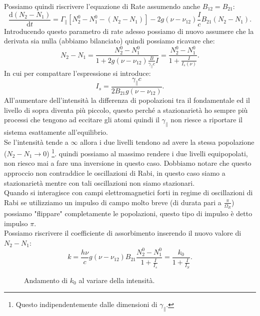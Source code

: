 Possiamo quindi riscrivere l'equazione di Rate assumendo anche $B_{12}=B_{21}$:
\[
    \frac{\text{d} \left(N_2-N_1\right)}{\text{d} t} =
    \Gamma_{\parallel}\left[N_2^0-N_1^0 - \left(N_2-N_1\right)\right]
    -2g(\nu-\nu_{12}) \frac{I}{c}B_{21}\left(N_2-N_1\right)
.\] 
Introducendo questo parametro di rate adesso possiamo di nuovo assumere che la derivata sia nulla (abbiamo bilanciato) quindi possiamo ricavare che:
\[
    N_2-N_1 = \frac{N_2^0-N_1^0}{1+2g(\nu-\nu_{12})
    \frac{B}{\gamma_{\parallel}c}I}=
    \frac{N_2^0-N_1^0}{1+\frac{I}{I_s(\nu)}}
.\] 
In cui per compattare l'espressione si introduce:
\[
    I_s = \frac{\gamma_\parallel c}{2B_{21}g(\nu-\nu_{12})}
.\] 
All'aumentare dell'intensità la differenza di popolazioni tra il fondamentale ed il livello di sopra diventa più piccolo, questo perché a stazionarietà ho sempre più processi che tengono ad eccitare gli atomi quindi il $\gamma_\parallel$  non riesce a riportare il sistema esattamente all'equilibrio. \\
Se l'intensità tende a $\infty$ allora i due livelli tendono ad avere la stessa popolazione ($N_2-N_1\to 0$)
\footnote{Questo indipendentemente dalle dimensioni di $\gamma_\parallel$.}.
quindi possiamo al massimo rendere i due livelli equipopolati, non riesco mai a fare una inversione in questo caso.
Dobbiamo notare che questo approccio non contraddice le oscillazioni di Rabi, in questo caso siamo a stazionarietà mentre con tali oscillazioni non siamo stazionari. \\
Quando si interagisce con campi elettromagnetici forti in regime di oscillazioni di Rabi se utilizziamo un impulso di campo molto breve (di durata pari a $\frac{\pi}{\Omega_R}$) possiamo "flippare" completamente le popolazioni, questo tipo di impulso è detto impulso $\pi$. \\
Possiamo riscrivere il coefficiente di assorbimento inserendo il nuovo valore di $N_2-N_1$:
\[
    k= \frac{h\nu}{c}g(\nu-\nu_{12})B_{21} \frac{N_2^0-N_1^0}{1+\frac{I}{I_s}}=
    \frac{k_0}{1+\frac{I}{I_S}}
.\]
\begin{figure}[H]
    \centering
    \caption{Andamento di $k_0$ al variare della intensità.}
    \label{Andamento di k_0 al variare della intensità.}
\end{figure}
